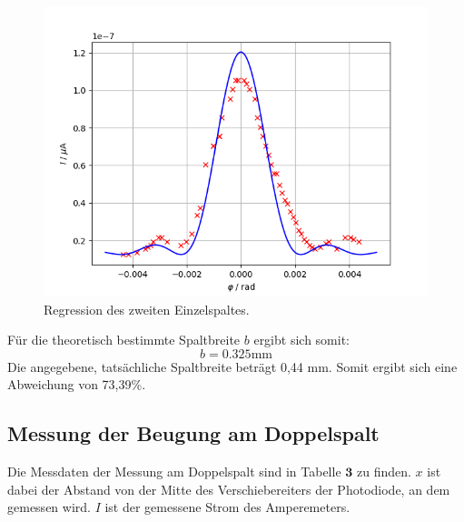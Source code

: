 \begin{figure}[H]
    \centering
    \includegraphics{Auswertung/Graph2.pdf}
    \caption{Regression des zweiten Einzelspaltes.}
    \label{fig:b}
\end{figure}

 Für die theoretisch bestimmte Spaltbreite $b$ ergibt sich somit:
 \begin{equation*}
 	b = 0.325 \text{mm}
\end{equation*}
Die angegebene, tatsächliche Spaltbreite beträgt 0,44 mm. Somit ergibt sich eine Abweichung von 73,39\%.

\subsection{Messung der Beugung am Doppelspalt}

Die Messdaten der Messung am Doppelspalt sind in Tabelle $\mathbf{3}$ zu finden. $x$ ist dabei der Abstand von der Mitte des Verschiebereiters der Photodiode, an dem gemessen wird. $I$ ist der gemessene Strom des Amperemeters.

